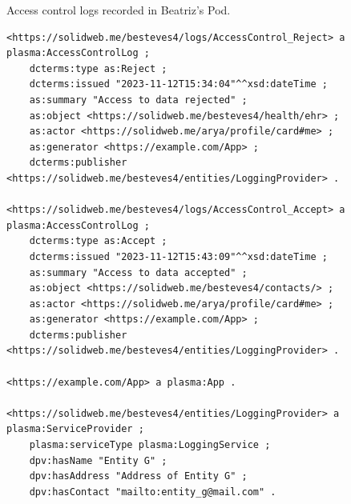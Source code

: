 \begin{listing}[htp]
\caption{Access control logs recorded in Beatriz's Pod.}
\label{list:plasma_accesscontrollog}
\begin{verbatim}
<https://solidweb.me/besteves4/logs/AccessControl_Reject> a plasma:AccessControlLog ;
	dcterms:type as:Reject ;
	dcterms:issued "2023-11-12T15:34:04"^^xsd:dateTime ;
	as:summary "Access to data rejected" ;
	as:object <https://solidweb.me/besteves4/health/ehr> ;
	as:actor <https://solidweb.me/arya/profile/card#me> ;
	as:generator <https://example.com/App> ;
	dcterms:publisher <https://solidweb.me/besteves4/entities/LoggingProvider> .

<https://solidweb.me/besteves4/logs/AccessControl_Accept> a plasma:AccessControlLog ;
	dcterms:type as:Accept ;
	dcterms:issued "2023-11-12T15:43:09"^^xsd:dateTime ;
	as:summary "Access to data accepted" ;
	as:object <https://solidweb.me/besteves4/contacts/> ;
	as:actor <https://solidweb.me/arya/profile/card#me> ;
	as:generator <https://example.com/App> ;
	dcterms:publisher <https://solidweb.me/besteves4/entities/LoggingProvider> .

<https://example.com/App> a plasma:App .

<https://solidweb.me/besteves4/entities/LoggingProvider> a plasma:ServiceProvider ;
	plasma:serviceType plasma:LoggingService ;
	dpv:hasName "Entity G" ;
	dpv:hasAddress "Address of Entity G" ;
	dpv:hasContact "mailto:entity_g@mail.com" .
\end{verbatim}
\end{listing}

